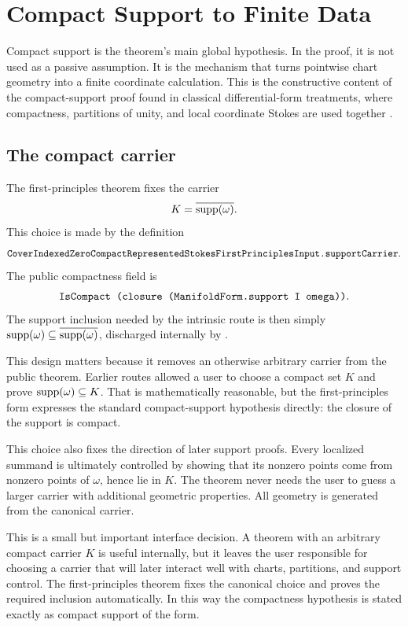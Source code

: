 \section{Compact Support to Finite Data}
\label{sec:compact-finite-data}

Compact support is the theorem's main global hypothesis.  In the proof, it is
not used as a passive assumption.  It is the mechanism that turns pointwise
chart geometry into a finite coordinate calculation.  This is the constructive
content of the compact-support proof found in classical differential-form
treatments, where compactness, partitions of unity, and local coordinate
Stokes are used together
\cite{munkres1991analysis,bott1982differential,morita2001geometry,lee2013smooth}.

\subsection{The compact carrier}

The first-principles theorem fixes the carrier
\[
  K = \overline{\operatorname{supp}(\omega)}.
\]
This choice is made by the definition
\[
\code{CoverIndexedZeroCompactRepresentedStokesFirstPrinciplesInput.supportCarrier}.
\]
The public compactness field is
\[
\code{IsCompact (closure (ManifoldForm.support I omega))}.
\]
The support inclusion needed by the intrinsic route is then simply
\(\operatorname{supp}(\omega)\subseteq \overline{\operatorname{supp}(\omega)}\), discharged internally by
.

This design matters because it removes an otherwise arbitrary carrier from the
public theorem.  Earlier routes allowed a user to choose a compact set \(K\)
and prove \(\operatorname{supp}(\omega)\subseteq K\).  That is mathematically reasonable, but
the first-principles form expresses the standard compact-support hypothesis
directly: the closure of the support is compact.

This choice also fixes the direction of later support proofs.  Every
localized summand is ultimately controlled by showing that its nonzero points
come from nonzero points of \(\omega\), hence lie in \(K\).  The theorem never
needs the user to guess a larger carrier with additional geometric properties.
All geometry is generated from the canonical carrier.

This is a small but important interface decision.  A theorem with an arbitrary
compact carrier \(K\) is useful internally, but it leaves the user responsible
for choosing a carrier that will later interact well with charts, partitions,
and support control.  The first-principles theorem fixes the canonical choice
and proves the required inclusion automatically.  In this way the compactness
hypothesis is stated exactly as compact support of the form.

